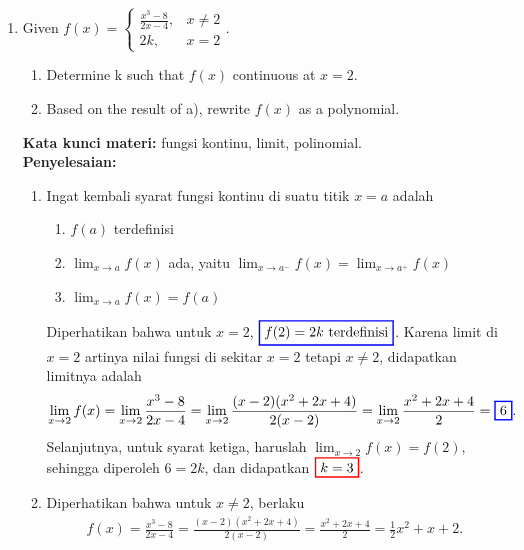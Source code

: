 \documentclass[10pt,openany,a4paper]{article}
\theoremstyle{definition}
\theoremstyle{definition}
\theoremstyle{plain}
\newenvironment{jawab}[2][tes]{%
\par\noindent\textbf{Kata kunci materi:} #1.\\
\textbf{Penyelesaian:} #2%
}{}
\begin{document}
\begin{enumerate}
    \item Given \(f(x) = \begin{cases} \frac{x^3-8}{2x-4}, & x \neq 2 \\ 2k, & x=2 \end{cases}\).
    \begin{enumerate}
        \item[a.] Determine k such that \(f(x)\) continuous at \(x = 2\).
        \item[b.] Based on the result of a), rewrite \(f(x)\) as a polynomial.
    \end{enumerate}
    \begin{jawab}[fungsi kontinu, limit, polinomial]{
        \begin{enumerate}
            \item Ingat kembali syarat fungsi kontinu di suatu titik \(x = a\) adalah
            \begin{enumerate}
                \item \(f(a)\) terdefinisi
                \item \(\displaystyle \lim_{x \to a} f(x)\) ada, yaitu $\displaystyle \lim_{x \to a^-} f(x) = \lim_{x \to a^+} f(x)$
                \item \(\displaystyle\lim_{x \to a} f(x) = f(a)\)
            \end{enumerate}
            Diperhatikan bahwa untuk \(x = 2\), $\colorlet{oldcolor}{.}
        \color{blue}
        \setlength{\fboxrule}{1pt} \boxed{\color{oldcolor}f(2) = 2k~\text{terdefinisi}}\color{oldcolor}$. Karena limit di $x=2$ artinya nilai fungsi di sekitar $x=2$ tetapi $x\neq 2$, didapatkan limitnya adalah
            \begin{align*}
            \lim_{x \to 2} f(x) = \lim_{x \to 2} \frac{x^3 - 8}{2x - 4} = \lim_{x \to 2} \frac{(x-2)(x^2 + 2x + 4)}{2(x-2)} = \lim_{x \to 2} \frac{x^2 + 2x + 4}{2} = \colorlet{oldcolor}{.}
        \color{blue}
        \setlength{\fboxrule}{1pt} \boxed{\color{oldcolor}6}\color{oldcolor}.
            \end{align*}
            Selanjutnya, untuk syarat ketiga, haruslah $\displaystyle\lim_{x \to 2} f(x) = f(2)$, sehingga diperoleh $6 = 2k$, dan didapatkan $\colorlet{oldcolor}{.}
        \color{red}
        \setlength{\fboxrule}{1pt} \boxed{\color{oldcolor}k=3}\color{oldcolor}$.
        \item Diperhatikan bahwa untuk $x\neq 2$, berlaku
        \begin{align*}
            f(x) = \frac{x^3 - 8}{2x - 4} = \frac{(x-2)(x^2 + 2x + 4)}{2(x-2)} = \frac{x^2 + 2x + 4}{2} = \frac{1}{2}x^2 + x + 2.

\end{align*}
\end{enumerate}}
\end{jawab}
\end{enumerate}
\end{document}
